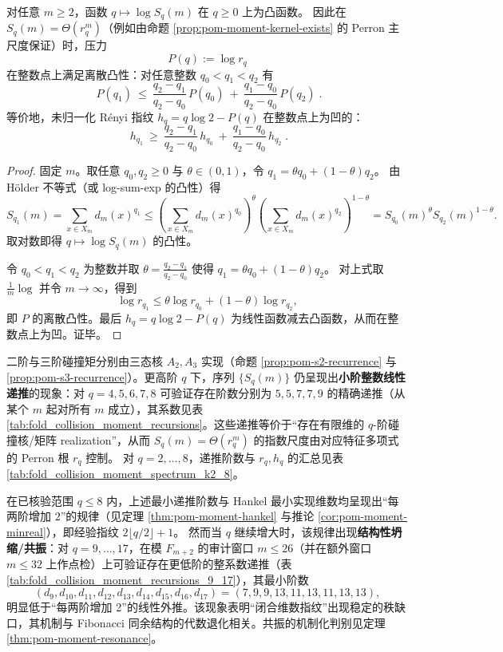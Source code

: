 \begin{proposition}[压力的凸性与指纹的凹性]\label{prop:pom-pressure-convexity}
对任意 \(m\ge 2\)，函数 \(q\mapsto \log S_q(m)\) 在 \(q\ge 0\) 上为凸函数。
因此在 \(S_q(m)=\Theta(r_q^m)\)（例如由命题 \ref{prop:pom-moment-kernel-exists} 的 Perron 主尺度保证）时，压力
\[
P(q):=\log r_q
\]
在整数点上满足离散凸性：对任意整数 \(q_0<q_1<q_2\) 有
\[
\boxed{\;
P(q_1)\ \le\ \frac{q_2-q_1}{q_2-q_0}\,P(q_0)\ +\ \frac{q_1-q_0}{q_2-q_0}\,P(q_2)\; }.
\]
等价地，未归一化 Rényi 指纹 \(h_q=q\log 2-P(q)\) 在整数点上为凹的：
\[
\boxed{\;
h_{q_1}\ \ge\ \frac{q_2-q_1}{q_2-q_0}\,h_{q_0}\ +\ \frac{q_1-q_0}{q_2-q_0}\,h_{q_2}\; }.
\]
\end{proposition}
\begin{proof}
固定 \(m\)。取任意 \(q_0,q_2\ge 0\) 与 \(\theta\in(0,1)\)，令 \(q_1=\theta q_0+(1-\theta)q_2\)。
由 Hölder 不等式（或 log-sum-exp 的凸性）得
\[
S_{q_1}(m)=\sum_{x\in X_m}d_m(x)^{q_1}
\le
\left(\sum_{x\in X_m}d_m(x)^{q_0}\right)^{\theta}
\left(\sum_{x\in X_m}d_m(x)^{q_2}\right)^{1-\theta}
=S_{q_0}(m)^{\theta}S_{q_2}(m)^{1-\theta}.
\]
取对数即得 \(q\mapsto \log S_q(m)\) 的凸性。
\par
令 \(q_0<q_1<q_2\) 为整数并取
\(
\theta=\frac{q_2-q_1}{q_2-q_0}
\)
使得 \(q_1=\theta q_0+(1-\theta)q_2\)。
对上式取 \(\frac{1}{m}\log\) 并令 \(m\to\infty\)，得到
\[
\log r_{q_1}\le \theta\log r_{q_0}+(1-\theta)\log r_{q_2},
\]
即 \(P\) 的离散凸性。最后 \(h_q=q\log 2-P(q)\) 为线性函数减去凸函数，从而在整数点上为凹。证毕。
\end{proof}

\begin{remark}\label{rem:pom-moment-rec}
二阶与三阶碰撞矩分别由三态核 \(A_2,A_3\) 实现（命题 \ref{prop:pom-s2-recurrence} 与 \ref{prop:pom-s3-recurrence}）。更高阶 \(q\) 下，序列 \(\{S_q(m)\}\) 仍呈现出\textbf{小阶整数线性递推}的现象：对 \(q=4,5,6,7,8\) 可验证存在阶数分别为 \(5,5,7,7,9\) 的精确递推（从某个 \(m\) 起对所有 \(m\) 成立），其系数见表 \ref{tab:fold_collision_moment_recursions}。这些递推等价于“存在有限维的 \(q\)-阶碰撞核/矩阵 realization”，从而 \(S_q(m)=\Theta(r_q^m)\) 的指数尺度由对应特征多项式的 Perron 根 \(r_q\) 控制。
对 \(q=2,\dots,8\)，递推阶数与 \(r_q,h_q\) 的汇总见表 \ref{tab:fold_collision_moment_spectrum_k2_8}。


在已核验范围 \(q\le 8\) 内，上述最小递推阶数与 Hankel 最小实现维数均呈现出“每两阶增加 \(2\)”的规律（见定理 \ref{thm:pom-moment-hankel} 与推论 \ref{cor:pom-moment-minreal}），即经验指纹
\(
2\lfloor q/2\rfloor+1
\)。
然而当 \(q\) 继续增大时，该规律出现\textbf{结构性坍缩/共振}：对 \(q=9,\dots,17\)，在模 \(F_{m+2}\) 的审计窗口 \(m\le 26\)（并在额外窗口 \(m\le 32\) 上作点检）上可验证存在更低阶的整系数递推（表 \ref{tab:fold_collision_moment_recursions_9_17}），其最小阶数
\[
(d_9,d_{10},d_{11},d_{12},d_{13},d_{14},d_{15},d_{16},d_{17})=(7,9,9,13,11,13,11,13,13),
\]
明显低于“每两阶增加 2”的线性外推。该现象表明“闭合维数指纹”出现稳定的秩缺口，其机制与 Fibonacci 同余结构的代数退化相关。共振的机制化判别见定理 \ref{thm:pom-moment-resonance}。
\end{remark}

